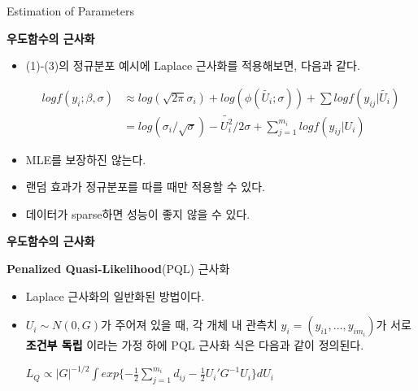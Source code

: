 \documentclass[9pt, xelatex]{beamer}
\begin{document}
{\begin{frame}[allowframebreaks]{Estimation of Parameters}
\begin{itemize}
		\end{itemize}
		\framebreak
		\textbf{우도함수의 근사화}
		\vspace{4mm}
		
		\begin{itemize}
			\item (1)-(3)의 정규분포 예시에 Laplace 근사화를 적용해보면, 다음과 같다.
			\begin{center}
				\begin{align}
					logf(y_{i};\beta,\sigma) & \approx log(\sqrt{2\pi}\sigma_{i})+log(\phi(\tilde{U_{i}};\sigma))+\sum logf(y_{ij}|\tilde{U_{i}})\\
					& =log(\sigma_{i}/\sqrt{\sigma})-\tilde{U_{i}^{2}}/2\sigma+\sum_{j=1}^{m_{i}}logf(y_{ij}|U_{i})
				\end{align}
			\end{center}
			
			\item MLE를 보장하진 않는다.
			\vspace{2mm}
			
			\item 랜덤 효과가 정규분포를 따를 때만 적용할 수 있다.
			\vspace{2mm}
			
			\item 데이터가 sparse하면 성능이 좋지 않을 수 있다.
		\end{itemize}
		\framebreak
		\textbf{우도함수의 근사화}
		\vspace{4mm}
		
		\textbf{Penalized Quasi-Likelihood}(PQL) 근사화
		\vspace{2mm}
		
		\begin{itemize}
			\item Laplace 근사화의 일반화된 방법이다.
			\vspace{2mm}
			
			\item  $U_{i} \sim N(0,G)$가 주어져 있을 때, 각 개체 내 관측치 $y_{i}=(y_{i1},...,y_{im_{i}})$가 서로 \textcolor{black}{\textbf{조건부 독립}} 이라는 가정 하에 PQL 근사화 식은 다음과 같이 정의된다.
			\vspace{1mm}
			
			\begin{center} $L_{Q} \propto |G|^{-1/2} \int exp \{-\frac{1}{2}\sum_{j=1}^{m_{i}}d_{ij}-\frac{1}{2}U_{i}'G^{-1}U_{i} \}dU_{i}$
			\end{center}
			\vspace{2mm}
			

\end{itemize}
\end{frame}}
\end{document}
